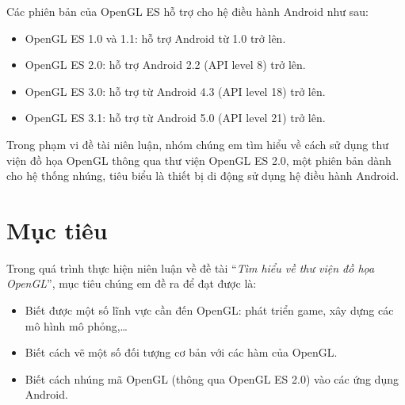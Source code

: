\documentclass[13pt,a4paper]{extreport}
\begin{document}
	Các phiên bản của OpenGL ES hỗ trợ cho hệ điều hành Android như sau:
		\begin{itemize}
			\item OpenGL ES 1.0 và 1.1: hỗ trợ Android từ 1.0 trở lên.
			
			\item OpenGL ES 2.0: hỗ trợ Android 2.2 (API level 8) trở lên.
			
			\item OpenGL ES 3.0: hỗ trợ từ Android 4.3 (API level 18) trở lên.
			
			\item OpenGL ES 3.1: hỗ trợ từ Android 5.0 (API level 21) trở lên.
		\end{itemize}
	
	Trong phạm vi đề tài niên luận, nhóm chúng em tìm hiểu về cách sử dụng thư viện đồ họa OpenGL thông qua thư viện OpenGL ES 2.0, một phiên bản dành cho hệ thống nhúng, tiêu biểu là thiết bị di động sử dụng hệ điều hành Android.

\section{Mục tiêu}
	Trong quá trình thực hiện niên luận về đề tài ``\emph{Tìm hiểu về thư viện đồ họa OpenGL}'', mục tiêu chúng em đề ra để đạt được là:
		\begin{itemize}
			\item Biết được một số lĩnh vực cần đến OpenGL: phát triển game, xây dựng các mô hình mô phỏng,\ldots					
			
			\item Biết cách vẽ một số đối tượng cơ bản với các hàm của OpenGL.
			
			\item Biết cách nhúng mã OpenGL (thông qua OpenGL ES 2.0) vào các ứng dụng Android.
		\end{itemize}
	
\end{document}
